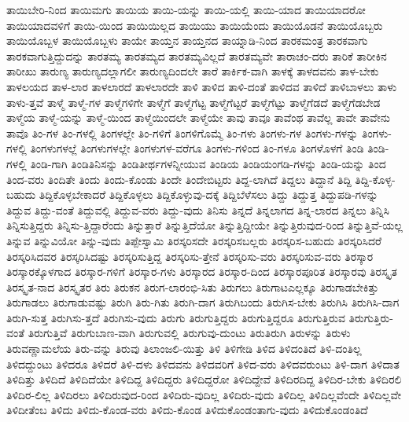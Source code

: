 {ತಾಯಿಬೇರಿ-ನಿಂದ
ತಾಯಿಮಗು
ತಾಯಿಯ
ತಾಯಿ-ಯನ್ನು
ತಾಯಿ-ಯಲ್ಲಿ
ತಾಯಿ-ಯಾದ
ತಾಯಿಯಾದರೋ
ತಾಯಿಯಾದವಳಿಗೆ
ತಾಯಿ-ಯಿಂದ
ತಾಯಿಯಿಲ್ಲದ
ತಾಯಿಯು
ತಾಯಿಯೆಂದು
ತಾಯಿಯೊಡನೆ
ತಾಯಿಯೊಬ್ಬರು
ತಾಯಿಯೊಬ್ಬಳ
ತಾಯಿಯೊಬ್ಬಳು
ತಾಯೇ
ತಾಯ್ತನ
ತಾಯ್ತನದ
ತಾಯ್ನಾಡಿ-ನಿಂದ
ತಾರಕಮಂತ್ರ
ತಾರಕವಾಗು
ತಾರಕವಾಗುತ್ತಿದ್ದುದನ್ನು
ತಾರತಮ್ಯ
ತಾರತಮ್ಯದ
ತಾರತಮ್ಯವಿಲ್ಲದೆ
ತಾರತಮ್ಯವೇ
ತಾರಾಚಂ-ದರು
ತಾರಿಕೆ
ತಾರೀಕಿನ
ತಾರೀಖು
ತಾರುಣ್ಯ
ತಾರುಣ್ಯದಲ್ಲಾಗಲೀ
ತಾರುಣ್ಯದಿಂದಲೇ
ತಾರೆ
ತಾರ್ಕಿಕ-ವಾಗಿ
ತಾಳಕ್ಕೆ
ತಾಳದವನು
ತಾಳ-ಬೇಕು
ತಾಳಲಯದ
ತಾಳ-ಲಾರ
ತಾಳಲಾರದೆ
ತಾಳಲಾರದೇ
ತಾಳಿ
ತಾಳಿದ
ತಾಳಿ-ದಂತೆ
ತಾಳಿದವ
ತಾಳಿದೆ
ತಾಳಿಬಾಳಲು
ತಾಳು
ತಾಳು-ತ್ತವೆ
ತಾಳ್ಮೆ
ತಾಳ್ಮೆ-ಗಳ
ತಾಳ್ಮೆಗಳಿಗೇ
ತಾಳ್ಮೆಗೆ
ತಾಳ್ಮೆಗೆಟ್ಟ
ತಾಳ್ಮೆಗೆಟ್ಟರೆ
ತಾಳ್ಮೆಗೆಟ್ಟು
ತಾಳ್ಮೆಗೆಡದೆ
ತಾಳ್ಮೆಗೆಡಬೇಡ
ತಾಳ್ಮೆಯ
ತಾಳ್ಮೆ-ಯನ್ನು
ತಾಳ್ಮೆ-ಯಿಂದ
ತಾಳ್ಮೆಯಿಂದಲೇ
ತಾಳ್ಮೆಯೇ
ತಾವು
ತಾವೂ
ತಾವೆಂಥ
ತಾವೆಲ್ಲ
ತಾವೇ
ತಾವೇನು
ತಾವೊ
ತಿಂ-ಗಳ
ತಿಂ-ಗಳಲ್ಲಿ
ತಿಂಗಳಲ್ಲೇ
ತಿಂ-ಗಳಿಗೆ
ತಿಂಗಳಿಗೊಮ್ಮೆ
ತಿಂ-ಗಳು
ತಿಂಗಳು-ಗಳ
ತಿಂಗಳು-ಗಳನ್ನು
ತಿಂಗಳು-ಗಳಲ್ಲಿ
ತಿಂಗಳುಗಳಲ್ಲೆ
ತಿಂಗಳುಗಳಲ್ಲೇ
ತಿಂಗಳುಗಳ-ವರೆಗೂ
ತಿಂಗಳು-ಗಳಿಂದ
ತಿಂ-ಗಳೂ
ತಿಂಗಳೊಳಗೆ
ತಿಂಡಿ
ತಿಂಡಿ-ಗಳಲ್ಲಿ
ತಿಂಡಿ-ಗಾಗಿ
ತಿಂಡಿತಿನಿಸನ್ನು
ತಿಂಡಿತೀರ್ಥಗಳನ್ನೀಯುವ
ತಿಂಡಿಯ
ತಿಂಡಿಯಂಗಡಿ-ಗಳನ್ನು
ತಿಂಡಿ-ಯನ್ನು
ತಿಂದ
ತಿಂದ-ವರು
ತಿಂದಿತೇ
ತಿಂದು
ತಿಂದು-ಕೊಂಡು
ತಿಂದೇ
ತಿಂದೇಬಿಟ್ಟರು
ತಿದ್ದ-ಲಾಗಿದೆ
ತಿದ್ದಲು
ತಿದ್ದಾನೆ
ತಿದ್ದಿ
ತಿದ್ದಿ-ಕೊಳ್ಳ-ಬಹುದು
ತಿದ್ದಿಕೊಳ್ಳಬೇಕಾದರೆ
ತಿದ್ದಿಕೊಳ್ಳಲು
ತಿದ್ದಿಕೊಳ್ಳುವು-ದಕ್ಕೆ
ತಿದ್ದಿಬೆಳೆಸಲು
ತಿದ್ದು
ತಿದ್ದುತ್ತ
ತಿದ್ದುಪಡಿ-ಗಳನ್ನು
ತಿದ್ದುವ
ತಿದ್ದು-ವಂತೆ
ತಿದ್ದುವಲ್ಲಿ
ತಿದ್ದುವ-ವರು
ತಿದ್ದು-ವುದು
ತಿನಿಸು
ತಿನ್ನದೆ
ತಿನ್ನಲಾಗದ
ತಿನ್ನ-ಲಾರದ
ತಿನ್ನಲು
ತಿನ್ನಿಸಿ
ತಿನ್ನಿಸುತ್ತಿದ್ದರು
ತಿನ್ನಿಸು-ತ್ತಿದ್ದಾರೆಂದು
ತಿನ್ನುತ್ತಾರೆ
ತಿನ್ನುತ್ತಿದೆಯೋ
ತಿನ್ನುತ್ತಿದ್ದೀಯೇ
ತಿನ್ನುತ್ತಿರುವುದ-ರಿಂದ
ತಿನ್ನುತ್ತಿವೆ-ಯಲ್ಲ
ತಿನ್ನುವ
ತಿನ್ನುವಿಯೋ
ತಿನ್ನು-ವುದು
ತಿಪ್ಪೇಸ್ವಾಮಿ
ತಿರಸ್ಕರಿಸದೇ
ತಿರಸ್ಕರಿಸಬಲ್ಲರು
ತಿರಸ್ಕರಿಸ-ಬಹುದು
ತಿರಸ್ಕರಿಸಿದರೆ
ತಿರಸ್ಕರಿಸಿದವರ
ತಿರಸ್ಕರಿಸಿದಷ್ಟು
ತಿರಸ್ಕರಿಸುತ್ತಿದ್ದ
ತಿರಸ್ಕರಿಸು-ತ್ತೇನೆ
ತಿರಸ್ಕರಿಸು-ವರು
ತಿರಸ್ಕರಿಸುವ-ವರು
ತಿರಸ್ಕಾರ
ತಿರಸ್ಕಾರಕ್ಕೊಳಗಾದ
ತಿರಸ್ಕಾರ-ಗಳಿಗೆ
ತಿರಸ್ಕಾರ-ಗಳು
ತಿರಸ್ಕಾರದ
ತಿರಸ್ಕಾರ-ದಿಂದ
ತಿರಸ್ಕಾರಪೂರಿತ
ತಿರಸ್ಕಾರವು
ತಿರಸ್ಕೃತ
ತಿರಸ್ಕೃತ-ನಾದ
ತಿರಸ್ಕೃತರ
ತಿರು
ತಿರುಕನ
ತಿರುಗ-ಲಾರಂಭಿ-ಸಿತು
ತಿರುಗಲು
ತಿರುಗಾಟಎಲ್ಲಕ್ಕೂ
ತಿರುಗಾಡಬೇಕಿತ್ತು
ತಿರುಗಾಡಲು
ತಿರುಗಾಡುವಷ್ಟು
ತಿರುಗಿ
ತಿರು-ಗಿತು
ತಿರುಗಿ-ದಾಗ
ತಿರುಗಿಬಂದು
ತಿರುಗಿಸ-ಬೇಕು
ತಿರುಗಿಸಿ
ತಿರುಗಿಸಿ-ದಾಗ
ತಿರುಗಿ-ಸುತ್ತ
ತಿರುಗಿಸು-ತ್ತದೆ
ತಿರುಗಿಸು-ವುದು
ತಿರುಗು
ತಿರುಗುತ್ತಿದ್ದರು
ತಿರುಗುತ್ತಿದ್ದರೂ
ತಿರುಗುತ್ತಿರುವ
ತಿರುಗುತ್ತಿರು-ವಂತೆ
ತಿರುಗುತ್ತಿವೆ
ತಿರುಗುಬಾಣ-ವಾಗಿ
ತಿರುಗುವಲ್ಲಿ
ತಿರುಗುವು-ದುಂಟು
ತಿರುತಿರುಗಿ
ತಿರುಳನ್ನು
ತಿರುಳು
ತಿರುವಣ್ಣಾಮಲೆಯ
ತಿರು-ವನ್ನು
ತಿರುವು
ತಿಲಾಂಜಲಿ-ಯಿತ್ತು
ತಿಳಿ
ತಿಳಿಗೇಡಿ
ತಿಳಿದ
ತಿಳಿದಂತಿದೆ
ತಿಳಿ-ದಂತಿಲ್ಲ
ತಿಳಿದದ್ದುಂಟು
ತಿಳಿದರೂ
ತಿಳಿದರೆ
ತಿಳಿ-ದಳು
ತಿಳಿದವನು
ತಿಳಿದವರಿಗೆ
ತಿಳಿದ-ವರು
ತಿಳಿದವರುಂಟು
ತಿಳಿ-ದಾಗ
ತಿಳಿದಾತ
ತಿಳಿದಿತ್ತು
ತಿಳಿದಿದೆ
ತಿಳಿದಿದೆಯೇ
ತಿಳಿದಿದ್ದ
ತಿಳಿದಿದ್ದರು
ತಿಳಿದಿದ್ದರೋ
ತಿಳಿದಿದ್ದೇವೆ
ತಿಳಿದಿರದಿದ್ದ
ತಿಳಿದಿರ-ಬೇಕು
ತಿಳಿದಿರಲಿ
ತಿಳಿದಿರ-ಲಿಲ್ಲ
ತಿಳಿದಿರಲು
ತಿಳಿದಿರುವುದ-ರಿಂದ
ತಿಳಿದಿರು-ವುದಿಲ್ಲ
ತಿಳಿದಿರು-ವುದು
ತಿಳಿದಿಲ್ಲ
ತಿಳಿದಿಲ್ಲವೆಂದೇ
ತಿಳಿದಿಲ್ಲವೇ
ತಿಳಿದೀತೆಂಬ
ತಿಳಿದು
ತಿಳಿದು-ಕೊಂಡ-ವರು
ತಿಳಿದು-ಕೊಂಡ
ತಿಳಿದುಕೊಂಡಂತಾಗು-ವುದು
ತಿಳಿದುಕೊಂಡಂತಿದೆ
}
